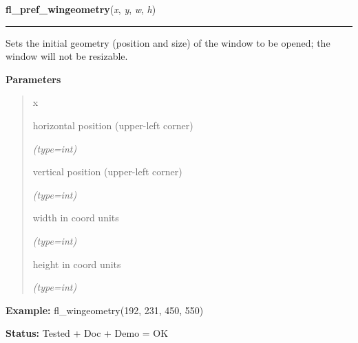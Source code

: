     \label{xformslib:flxbasic:fl_wingeometry}

    \vspace{0.5ex}

\hspace{.8\funcindent}\begin{boxedminipage}{\funcwidth}

    \raggedright \textbf{fl\_pref\_wingeometry}(\textit{x}, \textit{y}, \textit{w}, \textit{h})

    \vspace{-1.5ex}

    \rule{\textwidth}{0.5\fboxrule}
\setlength{\parskip}{2ex}
    Sets the initial geometry (position and size) of the window to be 
    opened; the window will not be resizable.

\setlength{\parskip}{1ex}
      \textbf{Parameters}
      \vspace{-1ex}

      \begin{quote}
        \begin{Ventry}{x}

          \item[x]

          horizontal position (upper-left corner)

            {\it (type=int)}

          \item[y]

          vertical position (upper-left corner)

            {\it (type=int)}

          \item[w]

          width in coord units

            {\it (type=int)}

          \item[h]

          height in coord units

            {\it (type=int)}

        \end{Ventry}

      \end{quote}

\textbf{Example:} fl\_wingeometry(192, 231, 450, 550)



\textbf{Status:} Tested + Doc + Demo = OK



    \end{boxedminipage}

